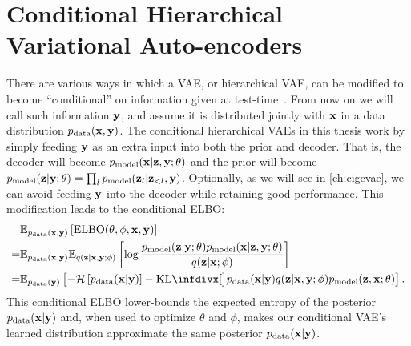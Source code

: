 \section{Conditional Hierarchical Variational Auto-encoders}
There are various ways in which a VAE, or hierarchical VAE, can be modified to become ``conditional'' on information given at test-time~\citet{sohn2015learning,ivanov2018variational}. From now on we will call such information ${\mathbf{y}}$, and assume it is distributed jointly with ${\mathbf{x}}$ in a data distribution $p_{\rm{data}}({\mathbf{x}}, {\mathbf{y}})$. The conditional hierarchical VAEs in this thesis work by simply feeding ${\mathbf{y}}$ as an extra input into both the prior and decoder. That is, the decoder will become $p_{\rm{model}}({\mathbf{x}}|{\mathbf{z}}, {\mathbf{y}}; \theta)$ and the prior will become $p_{\rm{model}}({\mathbf{z}}|{\mathbf{y}}; \theta) = \prod_l p_{\rm{model}}({\mathbf{z}}_l|{\mathbf{z}}_{<l},{\mathbf{y}})$. Optionally, as we will see in \cref{ch:cigcvae}, we can avoid feeding ${\mathbf{y}}$ into the decoder while retaining good performance. This modification leads to the conditional ELBO:
\begin{align}
  & \EX_{\pdata{}(\rvx,\rvy)} \left[ \text{ELBO}(\theta, \phi, \rvx, \rvy) \right] \\
  =& \EX_{\pdata(\rvx,\rvy)} \EX_{q(\rvz|\rvx, \rvy; \phi)} \left[ \log\frac{\pmodel{}(\rvz|\rvy; \theta)\pmodel{}(\rvx|\rvz, \rvy; \theta)}{q(\rvz|\rvx; \phi)} \right] \label{eq:conditional-eelbo}\\
  =& \EX_{\pdata(\rvy)} \left[ -\mathcal{H}\left[ \pdata(\rvx|\rvy) \right] - \kl[\big] { \pdata{}(\rvx|\rvy)q(\rvz|\rvx,\rvy; \phi) }{ \pmodel{}(\rvz, \rvx; \theta) } \right] . \label{eq:conditional-elbo-kl-joints}
\end{align}
This conditional ELBO lower-bounds the expected entropy of the posterior $p_{\rm{data}}({\mathbf{x}}|{\mathbf{y}})$ and, when used to optimize $\theta$ and $\phi$, makes our conditional VAE's learned distribution approximate the same posterior $p_{\rm{data}}({\mathbf{x}}|{\mathbf{y}})$.

